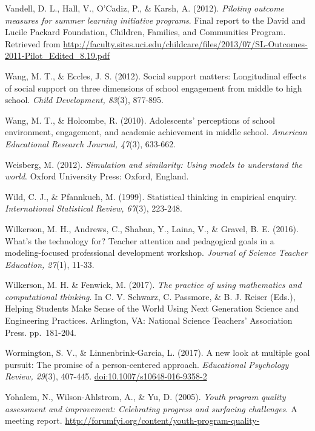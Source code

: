 \documentclass[]{msu-thesis}
\theoremstyle{definition}
\theoremstyle{definition}
\theoremstyle{definition}
\theoremstyle{remark}
\begin{document}
Vandell, D. L., Hall, V., O'Cadiz, P., \& Karsh, A. (2012).
\emph{Piloting outcome measures for summer learning initiative
programs}. Final report to the David and Lucile Packard Foundation,
Children, Families, and Communities Program. Retrieved from
\url{http://faculty.sites.uci.edu/childcare/files/2013/07/SL-Outcomes-2011-Pilot_Edited_8.19.pdf}

Wang, M. T., \& Eccles, J. S. (2012). Social support matters:
Longitudinal effects of social support on three dimensions of school
engagement from middle to high school. \emph{Child Development, 83}(3),
877-895.

Wang, M. T., \& Holcombe, R. (2010). Adolescents' perceptions of school
environment, engagement, and academic achievement in middle school.
\emph{American Educational Research Journal, 47}(3), 633-662.

Weisberg, M. (2012). \emph{Simulation and similarity: Using models to
understand the world}. Oxford University Press: Oxford, England.

Wild, C. J., \& Pfannkuch, M. (1999). Statistical thinking in empirical
enquiry. \emph{International Statistical Review, 67}(3), 223-248.

Wilkerson, M. H., Andrews, C., Shaban, Y., Laina, V., \& Gravel, B. E.
(2016). What's the technology for? Teacher attention and pedagogical
goals in a modeling-focused professional development workshop.
\emph{Journal of Science Teacher Education, 27}(1), 11-33.

Wilkerson, M. H. \& Fenwick, M. (2017). \emph{The practice of using
mathematics and computational thinking}. In C. V. Schwarz, C. Passmore,
\& B. J. Reiser (Eds.), Helping Students Make Sense of the World Using
Next Generation Science and Engineering Practices. Arlington, VA:
National Science Teachers' Association Press. pp.~181-204.

Wormington, S. V., \& Linnenbrink-Garcia, L. (2017). A new look at
multiple goal pursuit: The promise of a person-centered approach.
\emph{Educational Psychology Review, 29}(3), 407-445.
\url{doi:10.1007/s10648-016-9358-2}

Yohalem, N., Wilson-Ahlstrom, A., \& Yu, D. (2005). \emph{Youth program
quality assessment and improvement: Celebrating progress and surfacing
challenges}. A meeting report.
\url{http://forumfyi.org/content/youth-program-quality-}
\end{document}
